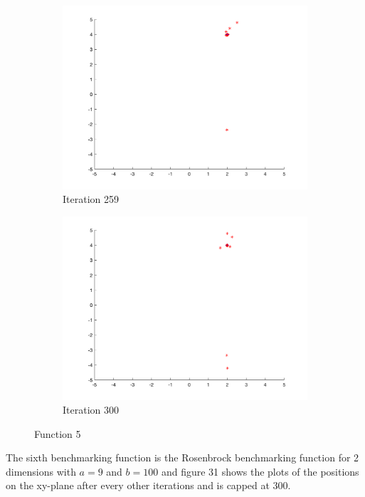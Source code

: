 \begin{figure}
\begin{subfigure}[b]{0.4\textwidth}
    \includegraphics[width=\textwidth]{img/smpl/rosn2d-2-100/loa-iter-259}
    \caption{Iteration 259}
    \label{fig:s5-iter-6}
  \end{subfigure}
  \begin{subfigure}[b]{0.4\textwidth}
    \includegraphics[width=\textwidth]{img/smpl/rosn2d-2-100/loa-iter-300}
    \caption{Iteration 300}
    \label{fig:s5-iter-7}
  \end{subfigure}
  \caption{Function 5}
\end{figure}


The sixth benchmarking function is the Rosenbrock benchmarking function for 2 dimensions with $a = 9$ and $b=100$ and figure 31 shows the plots of the positions on the xy-plane after every other iterations and is capped at 300.

